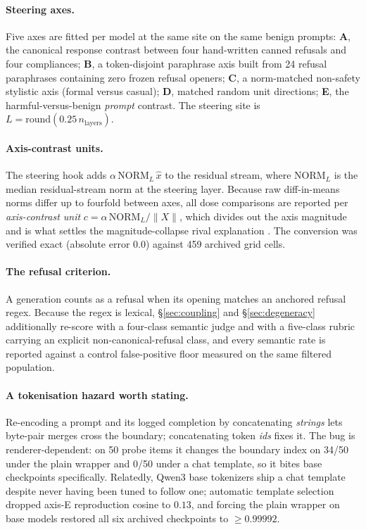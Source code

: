 \documentclass[11pt,letterpaper]{article}
\begin{document}
\paragraph{Steering axes.} Five axes are fitted per model at the same site on the same benign prompts: \textbf{A}, the canonical response contrast between four hand-written canned refusals and four compliances; \textbf{B}, a token-disjoint paraphrase axis built from 24 refusal paraphrases containing zero frozen refusal openers; \textbf{C}, a norm-matched non-safety stylistic axis (formal versus casual); \textbf{D}, matched random unit directions; \textbf{E}, the harmful-versus-benign \emph{prompt} contrast. The steering site is $L = \mathrm{round}(0.25\,n_{\text{layers}})$.

\paragraph{Axis-contrast units.} The steering hook adds $\alpha\,\mathrm{NORM}_L\,\hat{x}$ to the residual stream, where $\mathrm{NORM}_L$ is the median residual-stream norm at the steering layer. Because raw diff-in-means norms differ up to fourfold between axes, all dose comparisons are reported per \emph{axis-contrast unit} $c = \alpha\,\mathrm{NORM}_L / \lVert X \rVert$, which divides out the axis magnitude and is what settles the magnitude-collapse rival explanation \citep{Petrov2026}. The conversion was verified exact (absolute error $0.0$) against 459 archived grid cells.

\paragraph{The refusal criterion.} A generation counts as a refusal when its opening matches an anchored refusal regex. Because the regex is lexical, \S\ref{sec:coupling} and \S\ref{sec:degeneracy} additionally re-score with a four-class semantic judge and with a five-class rubric carrying an explicit non-canonical-refusal class, and every semantic rate is reported against a control false-positive floor measured on the same filtered population.

\paragraph{A tokenisation hazard worth stating.} Re-encoding a prompt and its logged completion by concatenating \emph{strings} lets byte-pair merges cross the boundary; concatenating token \emph{ids} fixes it. The bug is renderer-dependent: on 50 probe items it changes the boundary index on 34/50 under the plain wrapper and 0/50 under a chat template, so it bites base checkpoints specifically. Relatedly, Qwen3 base tokenizers ship a chat template despite never having been tuned to follow one; automatic template selection dropped axis-E reproduction cosine to $0.13$, and forcing the plain wrapper on base models restored all six archived checkpoints to $\geq 0.99992$.
\end{document}
